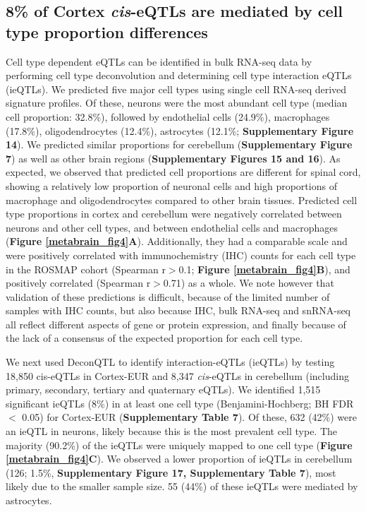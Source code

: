 \subsection{8\% of Cortex \emph{cis}-eQTLs are mediated by cell type proportion differences  }
Cell type dependent eQTLs can be identified in bulk RNA-seq data by performing cell type deconvolution and determining cell type interaction eQTLs (ieQTLs)\cite{donovanCellularDeconvolutionGTEx2020,glastonburyCellTypeHeterogeneityAdipose2019,raulaguirregamboaDeconvolutionBulkBlood2020}. We predicted five major cell types using single cell RNA-seq derived signature profiles\cite{zhengyuCellMapCharacterizingType}. Of these, neurons were the most abundant cell type (median cell proportion: 32.8\%), followed by endothelial cells (24.9\%), macrophages (17.8\%), oligodendrocytes (12.4\%), astrocytes (12.1\%; \textbf{Supplementary Figure 14}). We predicted similar proportions for cerebellum (\textbf{Supplementary Figure 7}) as well as other brain regions (\textbf{Supplementary Figures 15 and 16}). As expected, we observed that predicted cell proportions are different for spinal cord, showing a relatively low proportion of neuronal cells and high proportions of macrophage and oligodendrocytes compared to other brain tissues. Predicted cell type proportions in cortex and cerebellum were negatively correlated between neurons and other cell types, and between endothelial cells and macrophages (\textbf{Figure \ref{metabrain_fig4}A}). Additionally, they had a comparable scale and were positively correlated with immunochemistry (IHC) counts for each cell type in the ROSMAP cohort (Spearman r$>$0.1; \textbf{Figure \ref{metabrain_fig4}B})\cite{patrickDeconvolvingContributionsCelltype2020}, and positively correlated (Spearman r$>$0.71) as a whole. We note however that validation of these predictions is difficult, because of the limited number of samples with IHC counts, but also because IHC, bulk RNA-seq and snRNA-seq all reflect different aspects of gene or protein expression, and finally because of the lack of a consensus of the expected proportion for each cell type\cite{herculano-houzelHumanBrainNumbers2009,vonbartheldSearchTrueNumbers2016}. 

We next used DeconQTL\cite{raulaguirregamboaDeconvolutionBulkBlood2020} to identify interaction-eQTLs (ieQTLs) by testing 18,850 cis-eQTLs in Cortex-EUR and 8,347 \emph{cis}-eQTLs in cerebellum (including primary, secondary, tertiary and quaternary eQTLs). We identified 1,515 significant ieQTLs (8\%) in at least one cell type (Benjamini-Hochberg; BH FDR $<$ 0.05) for Cortex-EUR (\textbf{Supplementary Table 7}). Of these, 632 (42\%) were an ieQTL in neurons, likely because this is the most prevalent cell type. The majority (90.2\%) of the ieQTLs were uniquely mapped to one cell type (\textbf{Figure \ref{metabrain_fig4}C}). We observed a lower proportion of ieQTLs in cerebellum (126; 1.5\%, \textbf{Supplementary Figure 17, Supplementary Table 7}), most likely due to the smaller sample size. 55 (44\%) of these ieQTLs were mediated by astrocytes.  

